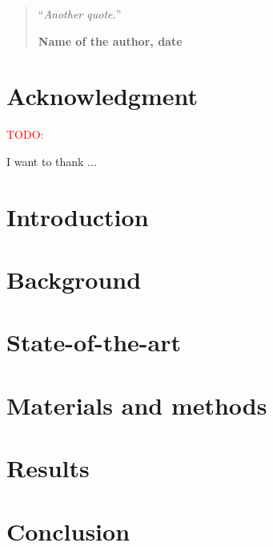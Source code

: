 \documentclass[11pt,a4paper,oneside]{book}
\newcommand{\todo}[1]{\textcolor{red}{TODO: #1}}
\begin{document}
\medskip

\begin{quotation}
  \noindent ``\emph{Another quote.}''
  \begin{flushright}\textbf{Name of the author, date}\end{flushright}
\end{quotation}


\chapter*{Acknowledgment}
\thispagestyle{empty} 

\todo{}

\noindent I want to thank ...

\thispagestyle{empty} 
\setcounter{page}{0}
\tableofcontents
\mainmatter 


\chapter{Introduction}
  \begingroup
  \let\clearpage\relax
  
  \endgroup


\chapter{Background}
  \begingroup
  \let\clearpage\relax
  
  
  \endgroup


\chapter{State-of-the-art}
  \begingroup
  \let\clearpage\relax
  
  \endgroup
  
  
  
  
  


\chapter{Materials and methods}
  \begingroup
  \let\clearpage\relax
  
  \endgroup


\chapter{Results}
  \begingroup
  \let\clearpage\relax
  
  \endgroup


\chapter{Conclusion}
  \begingroup
  \let\clearpage\relax
  
  \endgroup


\begin{appendices}
    
\end{appendices}


\appendix

\backmatter

\printindex %




\end{document}
